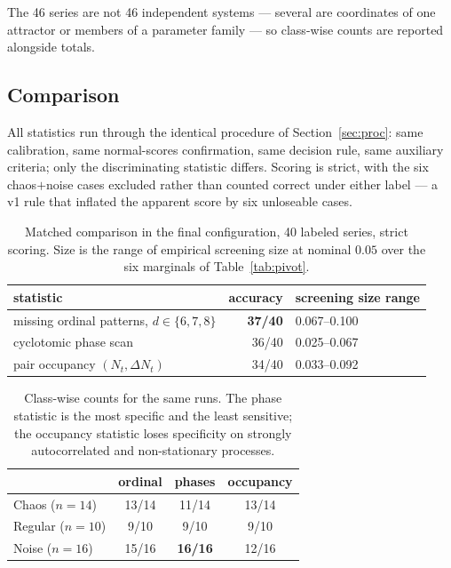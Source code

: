 \documentclass[11pt]{article}
\begin{document}
The 46 series are not 46 independent systems --- several are coordinates of one
attractor or members of a parameter family --- so class-wise counts are reported
alongside totals.

\subsection{Comparison}

All statistics run through the identical procedure of Section~\ref{sec:proc}:
same calibration, same normal-scores confirmation, same decision rule, same
auxiliary criteria; only the discriminating statistic differs. Scoring is
strict, with the six chaos${+}$noise cases excluded rather than counted correct
under either label --- a v1 rule that inflated the apparent score by six
unloseable cases.

\begin{table}[h]
\centering
\caption{Matched comparison in the final configuration, 40 labeled series,
strict scoring. Size is the range of empirical screening size at nominal $0.05$
over the six marginals of Table~\ref{tab:pivot}.}
\label{tab:compare}
\begin{tabular}{lrl}
\toprule
statistic & accuracy & screening size range \\
\midrule
missing ordinal patterns, $d\in\{6,7,8\}$ & \textbf{37/40} & 0.067--0.100 \\
cyclotomic phase scan                     & 36/40 & 0.025--0.067 \\
pair occupancy $(N_t,\Delta N_t)$         & 34/40 & 0.033--0.092 \\
\bottomrule
\end{tabular}
\end{table}

\begin{table}[h]
\centering
\caption{Class-wise counts for the same runs. The phase statistic is the most
specific and the least sensitive; the occupancy statistic loses specificity on
strongly autocorrelated and non-stationary processes.}
\label{tab:classwise}
\begin{tabular}{lccc}
\toprule
& ordinal & phases & occupancy \\
\midrule
Chaos ($n=14$)   & 13/14 & 11/14 & 13/14 \\
Regular ($n=10$) & 9/10  & 9/10  & 9/10 \\
Noise ($n=16$)   & 15/16 & \textbf{16/16} & 12/16 \\
\bottomrule
\end{tabular}
\end{table}
\end{document}
